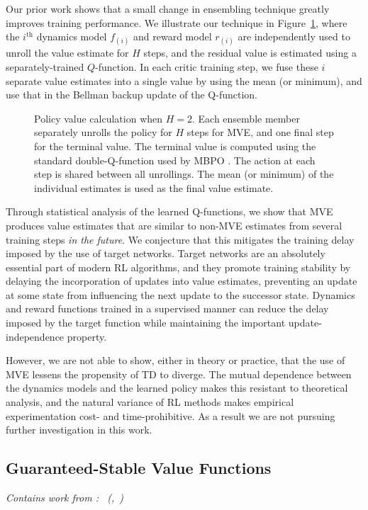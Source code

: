 \documentclass[11pt]{article}
\newcommand{\subsectionsubtitle}[1]{\vspace{-0.5em}\textit{#1}\vspace{0.5em}}
\begin{document}
Our prior work \cite{manek2021mve} shows that a small change in ensembling technique greatly improves training performance. We illustrate our technique in Figure~\ref{fig:policyvalue}, where the $i^\text{th}$ dynamics model $f_{(i)}$ and reward model $r_{(i)}$ are independently used to unroll the value estimate for $H$ steps, and the residual value is estimated using a separately-trained $Q$-function. In each critic training step, we fuse these $i$ separate value estimates into a single value by using the mean (or minimum), and use that in the Bellman backup update of the Q-function.
\begin{figure}
    \centering
    

    \caption{Policy value calculation when $H=2$. Each ensemble member separately unrolls the policy for $H$ steps for MVE, and one final step for the terminal value. The terminal value is computed using the standard double-Q-function used by MBPO \cite{janner2019mbpo}. The action at each step is shared between all unrollings. The mean (or minimum) of the individual estimates is used as the final value estimate. }
    \label{fig:policyvalue}
\end{figure}

Through statistical analysis of the learned Q-functions, we show that MVE produces value estimates that are similar to non-MVE estimates from several training steps \emph{in the future}. We conjecture that this mitigates the training delay imposed by the use of target networks. Target networks \cite[]{mnih2015humanlevel} are an absolutely essential part of modern RL algorithms, and they promote training stability by delaying the incorporation of updates into value estimates, preventing an update at some state from influencing the next update to the successor state. Dynamics and reward functions trained in a supervised manner can reduce the delay imposed by the target function while maintaining the important update-independence property.

However, we are not able to show, either in theory or practice, that the use of MVE lessens the propensity of TD to diverge. The mutual dependence between the dynamics models and the learned policy makes this resistant to theoretical analysis, and the natural variance of RL methods makes empirical experimentation cost- and time-prohibitive. As a result we are not pursuing further investigation in this work.


\subsection{Guaranteed-Stable Value Functions}
\subsectionsubtitle{Contains work from \cite{manek2019stable}: \citetitle{manek2019stable}~(\citeauthor{manek2019stable},~\citeyear{manek2019stable})}
\end{document}
